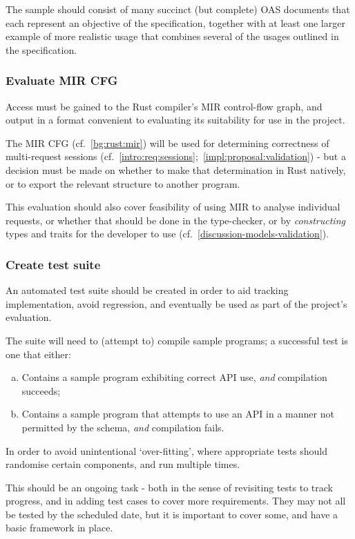 The sample should consist of many succinct (but complete) OAS documents that each represent an objective of the specification, together with at least one larger example of more realistic usage that combines several of the usages outlined in the specification.

\subsubsection{Evaluate MIR CFG}\label{task-eval-mir-cfg}
Access must be gained to the Rust compiler's MIR control-flow graph, and output in a format convenient to evaluating its suitability for use in the project.

The MIR CFG (cf.~\ref{bg:rust:mir}) will be used for determining correctness of multi-request sessions (cf.~\ref{intro:req:sessions};~\ref{impl:proposal:validation}) - but a decision must be made on whether to make that determination in Rust natively, or to export the relevant structure to another program.

This evaluation should also cover feasibility of using MIR to analyse individual requests, or whether that should be done in the type-checker, or by \emph{constructing} types and traits for the developer to use (cf.~\ref{discussion-models-validation}).

\subsubsection{Create test suite}\label{task-create-test-suite}
An automated test suite should be created in order to aid tracking implementation, avoid regression, and eventually be used as part of the project's evaluation.


The suite will need to (attempt to) compile sample programs; a successful test is one that either:
\begin{enumerate}[(a)]
	\item Contains a sample program exhibiting correct API use, \emph{and} compilation succeeds;
	\item Contains a sample program that attempts to use an API in a manner not permitted by the schema, \emph{and} compilation fails.
\end{enumerate}

In order to avoid unintentional `over-fitting', where appropriate tests should randomise certain components, and run multiple times.

This should be an ongoing task - both in the sense of revisiting tests to track progress, and in adding test cases to cover more requirements. They may not all be tested by the scheduled date, but it is important to cover some, and have a basic framework in place.

